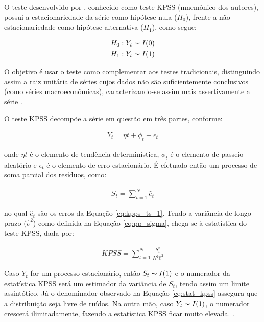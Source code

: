 O teste desenvolvido por , conhecido como teste KPSS (mnemônico dos autores), possui a estacionariedade da série como hipótese nula ($H_{0}$), frente a não estacionariedade como hipótese alternativa ($H_{1}$), como segue:

\begin{ceqn}
\begin{align} \label{eq:hipoteses_kpss}
&H_{0}: Y_{t} \thicksim I(0) \\
&H_{1}: Y_{t} \thicksim I(1) 
\end{align}
\end{ceqn}

O objetivo é usar o teste como complementar aos testes tradicionais, distinguindo assim a raiz unitária de séries cujos dados não são suficientemente conclusivos (como séries macroeconômicas), caracterizando-se assim mais assertivamente a série \cite{bueno2008}.

O teste KPSS decompõe a série em questão em três partes, conforme:

\begin{ceqn}
\begin{align} \label{eq:kpps_ts_1}
Y_{t} = \eta t + \phi_{t} + \epsilon_{t}
\end{align}
\end{ceqn} onde $\eta t$ é o elemento de tendência determinística, $\phi_{t}$ é o elemento de passeio aleatório e $\epsilon_{t}$ é o elemento de erro estacionário. É efetuado então um processo de soma parcial dos resíduos, como:

\begin{ceqn}
\begin{align} \label{eq:kpps_ts_2}
S_{t} = \sum_{t=1}^{N}{\hat{e}_{t}}
\end{align}
\end{ceqn} no qual $\hat{e}_{t}$ são os erros da Equação \eqref{eq:kpps_ts_1}. Tendo a variância de longo prazo ($\hat{\upsilon}^2$) como definida na Equação \eqref{eq:pp_sigma}, chega-se à estatística do teste KPSS, dada por:

\begin{ceqn}
\begin{align} \label{eq:stat_kpss}
KPSS = \sum_{t=1}^{N}{\frac{S_{t}^2}{N^2 \hat{\upsilon}^2}}
\end{align}
\end{ceqn}

Caso $Y_{t}$ for um processo estacionário, então $S_{t} \thicksim I(1)$ e o numerador da estatística KPSS será um estimador da variância de $S_{t}$, tendo assim um limite assintótico. Já o denominador observado na Equação \eqref{eq:stat_kpss} assegura que a distribuição seja livre de ruídos. Na outra mão, caso $Y_{t} \thicksim I(1)$, o numerador crescerá ilimitadamente, fazendo a estatística KPSS ficar muito elevada.  \cite{bueno2008}.

